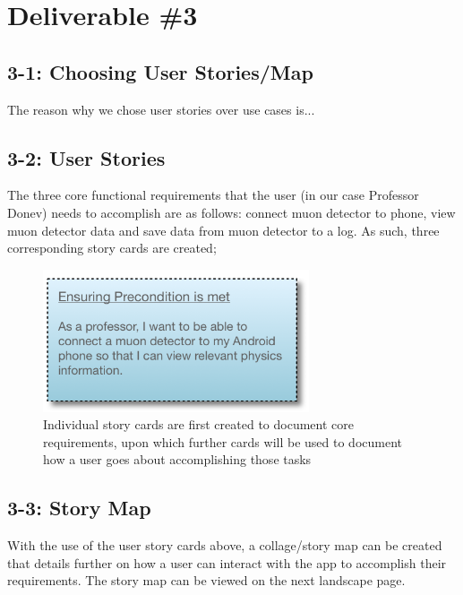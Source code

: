 \documentclass[11pt,a4paper]{article}
\begin{document}
\newpage

\section*{Deliverable \#3}

\subsection*{3-1: Choosing User Stories/Map}

The reason why we chose user stories over use cases is...

\subsection*{3-2: User Stories}

The three core functional requirements that the user (in our case Professor Donev) needs to accomplish are as follows: connect muon detector to phone, view muon detector data and save data from muon detector to a log. As such, three corresponding story cards are created; 


\begin{figure}[h]
  \centering
  
      \includegraphics[width=0.7\textwidth]{storycard1.png}
      \caption{Individual story cards are first created to document core requirements, upon which further cards will be used to document how a user goes about accomplishing those tasks}
  
\end{figure}


\subsection*{3-3: Story Map}

With the use of the user story cards above, a collage/story map can be created that details further on how a user can interact with the app to accomplish their requirements. The story map can be viewed on the next landscape page. 
\end{document}
